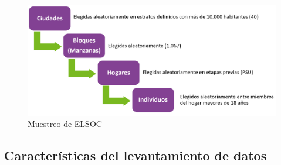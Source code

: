 \documentclass[
  12pt,
]{book}
\begin{document}
\begin{figure}

{\centering \includegraphics[width=1\linewidth,height=1\textheight]{imagenes/etapas_seleccion} 

}

\caption{Muestreo de ELSOC}\label{fig:ilust-etapas-seleccion}
\end{figure}

\hypertarget{caracteruxedsticas-del-levantamiento-de-datos}{%
\subsection*{Características del levantamiento de datos}\label{caracteruxedsticas-del-levantamiento-de-datos}}
\end{document}
